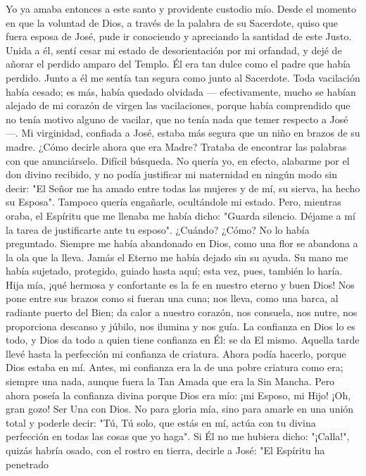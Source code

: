 \documentclass[12pt]{book} %
\begin{document}
Yo ya amaba entonces a este santo y providente custodio mío. Desde el momento en que la voluntad de Dios, a través 
de la palabra de su Sacerdote, quiso que fuera esposa de José, pude ir conociendo y apreciando la santidad de este Justo. Unida a él, sentí cesar mi estado de desorientación por mi orfandad, y dejé de añorar el perdido amparo del Templo. Él era tan dulce como el padre que había perdido. Junto a él me sentía tan segura como junto al Sacerdote. Toda vacilación había cesado; es más, había quedado olvidada — efectivamente, mucho se habían alejado de mi corazón de virgen las vacilaciones, porque había comprendido que no tenía motivo alguno de vacilar, que no tenía nada que temer respecto a José —. Mi virginidad, confiada a José, estaba más segura que un niño en brazos de su madre. 
¿Cómo decirle ahora que era Madre? Trataba de encontrar las palabras con que anunciárselo. Difícil búsqueda. No quería yo, en efecto, alabarme por el don divino recibido, y no podía justificar mi maternidad en ningún modo sin decir: "El Señor me ha amado entre todas las mujeres y de mí, su sierva, ha hecho su Esposa". Tampoco quería engañarle, ocultándole mi estado. 
Pero, mientras oraba, el Espíritu que me llenaba me había dicho: "Guarda silencio. Déjame a mí la tarea de justificarte ante tu esposo". ¿Cuándo? ¿Cómo? No lo había preguntado. Siempre me había abandonado en Dios, como una flor se abandona a la ola que la lleva. Jamás el Eterno me había dejado sin su ayuda. Su mano me había sujetado, protegido, guiado hasta aquí; esta vez, pues, también lo haría. 
Hija mía, ¡qué hermosa y confortante es la fe en nuestro eterno y buen Dios! Nos pone entre sus brazos como si fueran una cuna; nos lleva, como una barca, al radiante puerto del Bien; da calor a nuestro corazón, nos consuela, nos nutre, nos proporciona descanso y júbilo, nos ilumina y nos guía. La confianza en Dios lo es todo, y Dios da todo a quien tiene confianza en Él: se da El mismo. 
Aquella tarde llevé hasta la perfección mi confianza de criatura. Ahora podía hacerlo, porque Dios estaba en mí. Antes, mi confianza era la de una pobre criatura como era; siempre una nada, aunque fuera la Tan Amada que era la Sin Mancha. Pero ahora poseía la confianza divina porque Dios era mío: ¡mi Esposo, mi Hijo! ¡Oh, gran gozo! Ser Una con Dios. No para gloria mía, sino para amarle en una unión total y poderle decir: "Tú, Tú solo, que estás en mí, actúa con tu divina perfección en todas las cosas que yo haga". 
Si Él no me hubiera dicho: "¡Calla!", quizás habría osado, con el rostro en tierra, decirle a José: "El Espíritu ha penetrado 
\end{document}
